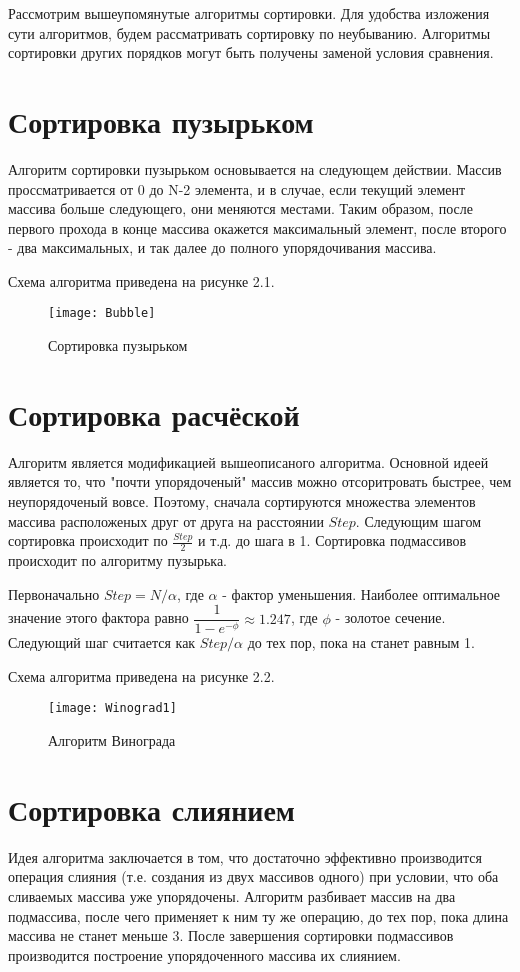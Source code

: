 Рассмотрим вышеупомянутые алгоритмы сортировки. Для удобства изложения сути алгоритмов, будем рассматривать сортировку по неубыванию. Алгоритмы сортировки других порядков могут быть получены заменой условия сравнения.

\section{Сортировка пузырьком}
Алгоритм сортировки пузырьком основывается на следующем действии. Массив проссматривается от 0 до N-2 элемента, и в случае, если текущий элемент массива больше следующего, они меняются местами. Таким образом, после первого прохода в конце массива окажется максимальный элемент, после второго - два максимальных, и так далее до полного упорядочивания массива.

Схема алгоритма приведена на рисунке 2.1.
\begin{figure}[h]
	\begin{center}
		{\texttt{[image: Bubble]}}
		\caption{Сортировка пузырьком}
	\end{center}
\end{figure}


\section{Сортировка расчёской}
Алгоритм является модификацией вышеописаного алгоритма. Основной идеей является то, что "почти упорядоченый" массив можно отсоритровать быстрее, чем неупорядоченый вовсе. Поэтому, сначала сортируются множества элементов массива расположеных друг от друга на расстоянии $ Step $. Следующим шагом сортировка происходит по $ \frac{Step}{2} $ и т.д. до шага в 1. Сортировка подмассивов происходит по алгоритму пузырька.

Первоначально $Step = N/\alpha$, где $\alpha$ - фактор уменьшения. Наиболее оптимальное значение этого фактора равно $\dfrac{1}{1-e^{-\phi}} \approx 1.247$, где $\phi$ - золотое сечение. Следующий шаг считается как $Step/\alpha$ до тех пор, пока на станет равным 1.

Схема алгоритма приведена на рисунке 2.2.
\begin{figure}[h]
	\begin{center}
		{\texttt{[image: Winograd1]}}
		\caption{Алгоритм Винограда}
	\end{center}
\end{figure}


\section{Сортировка слиянием}
Идея алгоритма заключается в том, что достаточно эффективно производится операция слияния (т.е. создания из двух массивов одного) при условии, что оба сливаемых массива уже упорядочены. Алгоритм разбивает массив на два подмассива, после чего применяет к ним ту же операцию, до тех пор, пока длина массива не станет меньше 3. После завершения сортировки подмассивов производится построение упорядоченного массива их слиянием.


